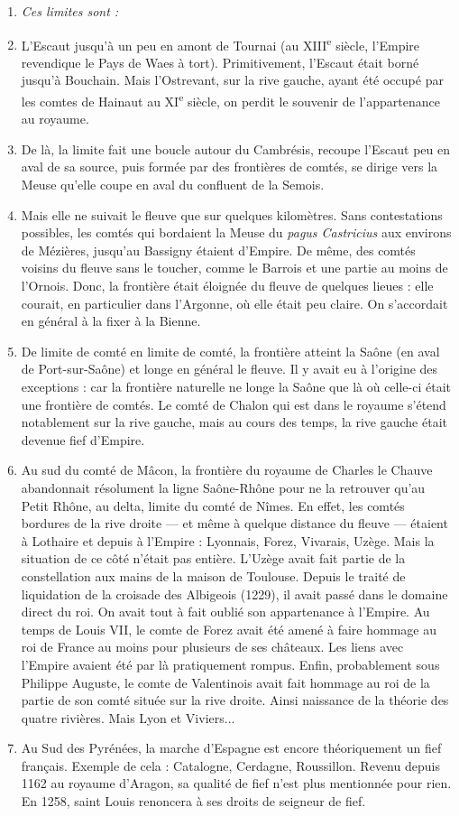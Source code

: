\documentclass[french,twoside]{book} %
\newlength{\listmod}
\newcommand{\listhead}[1]{\hspace{-1\listmod}\emph{#1}}
\begin{document}
\begin{enumerate}[itemsep=0pt,]
\item[]\listhead{Ces limites sont :}
\item L’Escaut jusqu’à un peu en amont de Tournai (au XIII\textsuperscript{e} siècle, l’Empire revendique le Pays de Waes à tort). Primitivement, l’Escaut était borné jusqu’à Bouchain. Mais l’Ostrevant, sur la rive gauche, ayant été occupé par les comtes de Hainaut au XI\textsuperscript{e} siècle, on perdit le souvenir de l’appartenance au royaume.
\item De là, la limite fait une boucle autour du Cambrésis, recoupe l’Escaut peu en aval de sa source, puis formée par des frontières de comtés, se dirige vers la Meuse qu’elle coupe en aval du confluent de la Semois.
\item Mais elle ne suivait le fleuve que sur quelques kilomètres. Sans contestations possibles, les comtés qui bordaient la Meuse du {\itshape pagus Castricius} aux environs de Mézières, jusqu’au Bassigny étaient d’Empire. De même, des comtés voisins du fleuve sans le toucher, comme le Barrois et une partie au moins de l’Ornois. Donc, la frontière était éloignée du fleuve de quelques lieues : elle courait, en particulier dans l’Argonne, où elle était peu claire. On s’accordait en général à la fixer à la Bienne.
\item De limite de comté en limite de comté, la frontière atteint la Saône (en aval de Port-sur-Saône) et longe en général le fleuve. Il y avait eu à l’origine des exceptions : car la frontière naturelle ne longe la Saône que là où celle-ci était une frontière de comtés. Le comté de Chalon qui est dans le royaume s’étend notablement sur la rive gauche, mais au cours des temps, la rive gauche était devenue fief d’Empire.
\item Au sud du comté de Mâcon, la frontière du royaume de Charles le Chauve abandonnait résolument la ligne Saône-Rhône pour ne la retrouver qu’au Petit Rhône, au delta, limite du comté de Nîmes. En effet, les comtés bordures de la rive droite — et même à quelque distance du fleuve — étaient à Lothaire et depuis à l’Empire : Lyonnais, Forez, Vivarais, Uzège. Mais la situation de ce côté n’était pas entière. L’Uzège avait fait partie de la constellation aux mains de la  
\label{p8} maison de Toulouse. Depuis le traité de liquidation de la croisade des Albigeois (1229), il avait passé dans le domaine direct du roi. On avait tout à fait oublié son appartenance à l’Empire. Au temps de Louis VII, le comte de Forez avait été amené à faire hommage au roi de France au moins pour plusieurs de ses châteaux. Les liens avec l’Empire avaient été par là pratiquement rompus. Enfin, probablement sous Philippe Auguste, le comte de Valentinois avait fait hommage au roi de la partie de son comté située sur la rive droite. Ainsi naissance de la théorie des quatre rivières. Mais Lyon et Viviers...
\item Au Sud des Pyrénées, la marche d’Espagne est encore théoriquement un fief français. Exemple de cela : Catalogne, Cerdagne, Roussillon. Revenu depuis 1162 au royaume d’Aragon, sa qualité de fief n’est plus mentionnée pour rien. En 1258, saint Louis renoncera à ses droits de seigneur de fief.


\end{enumerate}
\end{document}
